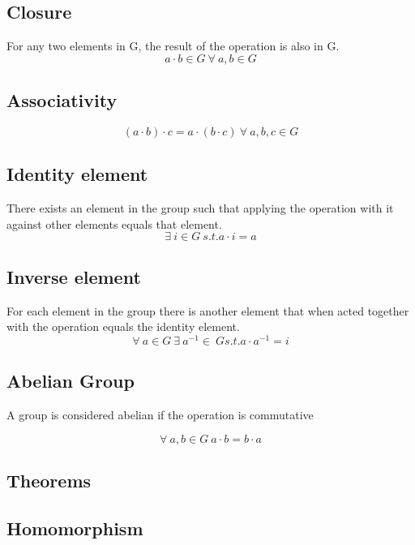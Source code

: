 \documentclass[10pt,a4paper]{report}
\begin{document}
\subsection*{Closure}
For any two elements in G, the result of the operation is also in G.
\begin{equation}
	a\cdot b \in G\ \forall\ a,b \in G
\end{equation}

\subsection*{Associativity}
\begin{equation}
	(a \cdot b) \cdot c = a \cdot (b \cdot c)\ \forall\ a,b,c \in G 
\end{equation}

\subsection*{Identity element}
There exists an element in the group such that applying the operation with it against other elements equals that element.
\begin{equation}
	\exists\ i\in G\ s.t. a \cdot i = a 
\end{equation}

\subsection*{Inverse element}
For each element in the group there is another element that when acted together with the operation equals the identity element.
\begin{equation}
	\forall\ a \in G\ \exists\ a^{-1} \in\ G s.t. a \cdot a^{-1} = i
\end{equation}

\subsection{Abelian Group}
A group is considered abelian if the operation is commutative

\begin{equation}
	\forall\ a,b \in G\ a \cdot b = b \cdot a
\end{equation}

\subsection{Theorems}

\subsection{Homomorphism}
\end{document}
